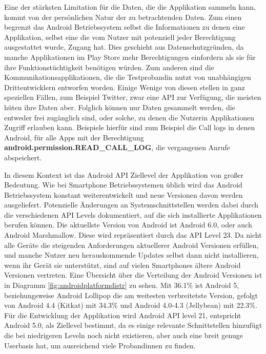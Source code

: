 Eine der stärksten Limitation für die Daten, die die Applikation sammeln kann, kommt von der persönlichen Natur der zu betrachtenden Daten.
Zum einen begrenzt das Android Betriebssystem selbst die Informationen zu denen eine Applikation, selbst eine die vom Nutzer mit potenziell jeder Berechtigung ausgestattet wurde, Zugang hat.
Dies geschieht aus Datenschutzgründen, da manche Applikationen im Play Store mehr Berechtigungen einfordern als sie für ihre Funktionstüchtigkeit benötigen würden.
Zum anderen sind die Kommunikationsapplikationen, die die Testprobandin nutzt von unabhängigen Drittentwicklern entworfen worden.
Einige Wenige von diesen stellen in ganz speziellen Fällen, zum Beispiel Twitter\cite{twitterapi}, zwar eine API zur Verfügung, die meisten hüten ihre Daten aber.
Folglich können nur Daten gesammelt werden, die entweder frei zugänglich sind, oder solche, zu denen die Nutzerin Applikationen Zugriff erlauben kann.
Beispiele hierfür sind zum Beispiel die Call logs in denen Android, für alle Apps mit der Berechtigung \textbf{android.permission.READ\_CALL\_LOG}, die vergangenen Anrufe abspeichert.
\par

In diesem Kontext ist das Android API Ziellevel der Applikation von großer Bedeutung.
Wie bei Smartphone Betriebssystemen üblich wird das Android Betriebssystem konstant weiterentwickelt und neue Versionen davon werden ausgeliefert.
Potenzielle Änderungen an Systemschnittstellen werden dabei durch die verschiedenen API Levels dokumentiert, auf die sich installierte Applikationen berufen können.
Die aktuellste Version von Android ist Android 6.0, oder auch Android Marshmallow.
Diese wird repräsentiert durch das API Level 23.
Da nicht alle Geräte die steigenden Anforderungen aktuellerer Android Versionen erfüllen, 
und manche Nutzer neu herauskommende Updates selbst dann nicht installieren, wenn ihr Gerät sie unterstützt, 
sind auf vielen Smartphones ältere Android Versionen vertreten.
Eine Übersicht über die Verteilung der Android Versionen ist in Diagramm \ref{fig:androidplatformdistr} zu sehen.
Mit 36.1\% ist Android 5, beziehungsweise Android Lollipop die am weitesten verbreitetste Version,
gefolgt von Android 4.4 (Kitkat) mit 34.3\% und Android 4.0-4.3 (Jellybean) mit 22.3\%\cite{androiddistr}.
Für die Entwicklung der Applikation wird Android API level 21, entspricht Android 5.0, als Ziellevel bestimmt, da es einige relevante Schnittstellen hinzufügt die bei niedrigeren Leveln noch nicht existieren, aber auch eine breit genuge Userbasis hat, um ausreichend viele Probandinnen zu finden.


